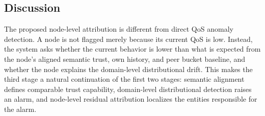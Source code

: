 \subsection{Discussion}
\label{sec:discussion}

The proposed node-level attribution is different from direct QoS anomaly
detection. A node is not flagged merely because its current QoS is low.
Instead, the system asks whether the current behavior is lower than what
is expected from the node's aligned semantic trust, own history, and peer
bucket baseline, and whether the node explains the domain-level
distributional drift. This makes the third stage a natural continuation
of the first two stages: semantic alignment defines comparable trust
capability, domain-level distributional detection raises an alarm, and
node-level residual attribution localizes the entities responsible for the
alarm.

